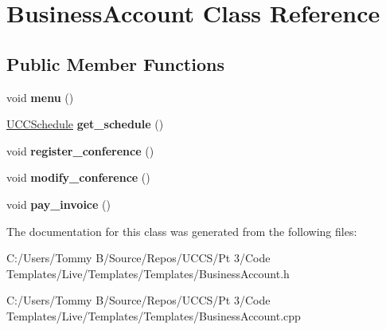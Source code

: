 \hypertarget{class_business_account}{}\section{Business\+Account Class Reference}
\label{class_business_account}
\subsection*{Public Member Functions}
\begin{DoxyCompactItemize}
\item 
\mbox{\label{class_business_account_a1399295464fa6e782da4f30a67789506}} 
void {\bfseries menu} ()
\item 
\mbox{\label{class_business_account_a80dc8bbbf8ffd432d8fe84e296a48901}} 
\hyperlink{class_u_c_c_schedule}{U\+C\+C\+Schedule} {\bfseries get\+\_\+schedule} ()
\item 
\mbox{\label{class_business_account_adabca858ea4eb3c3f2991b93de5ed244}} 
void {\bfseries register\+\_\+conference} ()
\item 
\mbox{\label{class_business_account_ac509750ce0e769d081e7eaa3fb8eb952}} 
void {\bfseries modify\+\_\+conference} ()
\item 
\mbox{\label{class_business_account_ac45eb8dddd224c43c5b5b199b1ba0b4e}} 
void {\bfseries pay\+\_\+invoice} ()
\end{DoxyCompactItemize}


The documentation for this class was generated from the following files\+:\begin{DoxyCompactItemize}
\item 
C\+:/\+Users/\+Tommy B/\+Source/\+Repos/\+U\+C\+C\+S/\+Pt 3/\+Code Templates/\+Live/\+Templates/\+Templates/Business\+Account.\+h\item 
C\+:/\+Users/\+Tommy B/\+Source/\+Repos/\+U\+C\+C\+S/\+Pt 3/\+Code Templates/\+Live/\+Templates/\+Templates/Business\+Account.\+cpp\end{DoxyCompactItemize}
